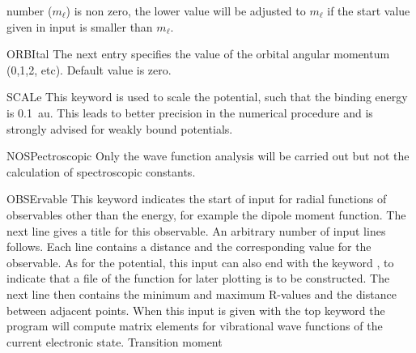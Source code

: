 \begin{keywordlist}
number ($m_\ell$) is non zero, the lower value will be adjusted to
$m_\ell$ if the start value given in input is smaller than
$m_\ell$.
\item[ORBItal]
The next entry specifies the value of the orbital angular momentum
(0,1,2, etc). Default value is zero.
\item[SCALe]
This keyword is used to scale the potential, such that the
binding energy is 0.1~au. This leads to better precision in the numerical
procedure and is strongly advised for weakly bound potentials.
\item[NOSPectroscopic]
Only the wave function analysis will be carried out but not the
calculation of spectroscopic constants.
\item[OBSErvable]
This keyword indicates the start of input for radial functions of observables
other than the energy, for example the dipole moment function. The next line
gives a title for this observable. An arbitrary number of input lines follows.
Each line contains a distance and the corresponding value for the observable.
As for the potential, this input can also end with the keyword ,
to indicate that a file of the function for later plotting is to be constructed.
The next line then contains the minimum and maximum R-{}values and the
distance between adjacent points. When this input is given with the top keyword
 the program will compute matrix elements for
vibrational wave functions of the current electronic state. Transition moment

\end{keywordlist}
